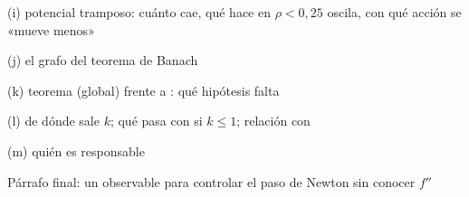 \clearpage
\begin{respuesta}[3.4cm]{(i) potencial tramposo: cuánto cae, qué hace en $\rho<0{,}25$ oscila, con qué acción se «mueve menos»}\end{respuesta}
\begin{respuesta}[7.5cm]{(j) el grafo del teorema de Banach}\end{respuesta}
\begin{respuesta}[2.4cm]{(k) teorema (global) frente a : qué hipótesis falta}\end{respuesta}
\begin{respuesta}[2.8cm]{(l) de dónde sale $k$; qué pasa con  si $k\le 1$; relación con }\end{respuesta}
\begin{respuesta}[1.6cm]{(m) quién es responsable}\end{respuesta}
\begin{respuesta}[3.0cm]{Párrafo final: un observable para controlar el paso de Newton sin conocer $f''$}\end{respuesta}

